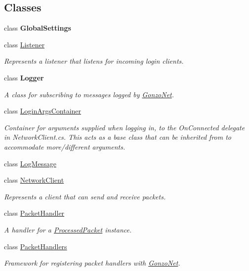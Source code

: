 \subsection*{Classes}
\begin{DoxyCompactItemize}
\item 
class {\bfseries Global\+Settings}
\item 
class \hyperlink{class_gonzo_net_1_1_listener}{Listener}
\begin{DoxyCompactList}\small\item\em Represents a listener that listens for incoming login clients. \end{DoxyCompactList}\item 
class {\bfseries Logger}
\begin{DoxyCompactList}\small\item\em A class for subscribing to messages logged by \hyperlink{namespace_gonzo_net}{Gonzo\+Net}. \end{DoxyCompactList}\item 
class \hyperlink{class_gonzo_net_1_1_login_args_container}{Login\+Args\+Container}
\begin{DoxyCompactList}\small\item\em Container for arguments supplied when logging in, to the On\+Connected delegate in Network\+Client.\+cs. This acts as a base class that can be inherited from to accommodate more/different arguments. \end{DoxyCompactList}\item 
class \hyperlink{class_gonzo_net_1_1_log_message}{Log\+Message}
\item 
class \hyperlink{class_gonzo_net_1_1_network_client}{Network\+Client}
\begin{DoxyCompactList}\small\item\em Represents a client that can send and receive packets. \end{DoxyCompactList}\item 
class \hyperlink{class_gonzo_net_1_1_packet_handler}{Packet\+Handler}
\begin{DoxyCompactList}\small\item\em A handler for a \hyperlink{class_gonzo_net_1_1_processed_packet}{Processed\+Packet} instance. \end{DoxyCompactList}\item 
class \hyperlink{class_gonzo_net_1_1_packet_handlers}{Packet\+Handlers}
\begin{DoxyCompactList}\small\item\em Framework for registering packet handlers with \hyperlink{namespace_gonzo_net}{Gonzo\+Net}. \end{DoxyCompactList}\item 

\end{DoxyCompactItemize}
